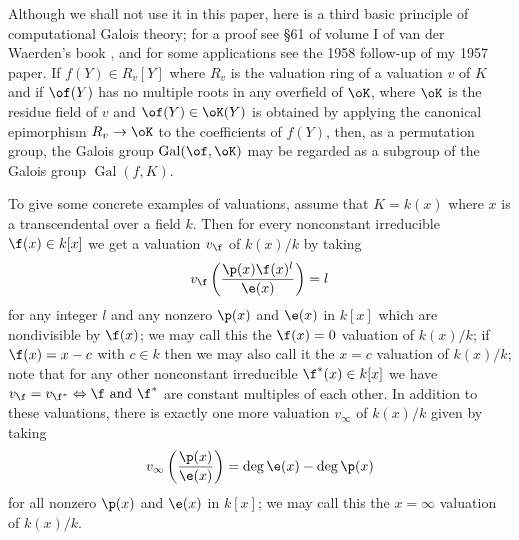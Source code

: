 Although we shall not use it in this paper, here is a 
third basic principle
of computational Galois theory; for a proof see \S61 of 
volume I of
van der Waerden's book \cite{V}, and for some applications 
see the 1958
follow-up \cite{A4} of my 1957 paper.
If $f(Y) \in R_v[Y]$ where $R_v$ is the valuation ring of 
a valuation
$v$ of $K$ and if $\of(Y)$ has no multiple roots in any 
overfield of
$\oK$, where $\oK$ is the residue field of $v$ and $\of(Y) 
\in \oK(Y)$
is obtained by applying the canonical epimorphism $R_v\to 
\oK$ to the 
coefficients of $f(Y)$, then, as a permutation group, the 
Galois group
$\operatorname{Gal}(\of,\oK)$ may be regarded as a 
subgroup of the Galois group 
$\operatorname{Gal}(f,K)$.
\endproclaim

To give some concrete examples of valuations, assume that 
$K=k(x)$ where
$x$ is a transcendental over a field $k$.
Then for every nonconstant irreducible $\f(x)\in k[x]$ we 
get a valuation 
$v_{\f}$ of $k(x)/k$ by taking 
$$v_{\f}\left(\frac{\p(x)\f(x)^l}{\e(x)}\right)=l$$
for any integer $l$ and any nonzero $\p(x)$ and $\e(x)$ in 
$k[x]$ which are 
nondivisible by $\f(x)$; we may call this the $\f(x)=0$ 
valuation of $k(x)/k$;
if $\f(x)=x-c$ with $c\in k$ then 
we may also call it the $x=c$ valuation of $k(x)/k$; note 
that
for any other nonconstant irreducible $\f^*(x)\in k[x]$ we 
have
$v_{\f}=v_{\f^*}\Leftrightarrow \f\text{ and }\f^*$ are 
constant multiples of
each other. In addition to these valuations, there is 
exactly one more 
valuation $v_{\infty}$ of $k(x)/k$ given by taking 
$$v_{\infty}\left(\frac{\p(x)}{\e(x)}\right)=\deg\e(x)-%
\deg\p(x)$$
for all nonzero $\p(x)$ and $\e(x)$ in $k[x]$; we may call 
this the $x=\infty$
valuation of $k(x)/k$.

